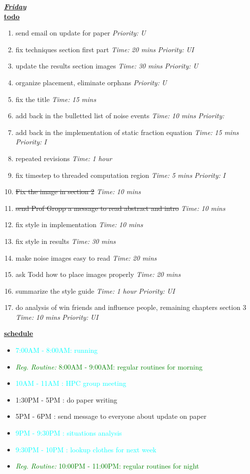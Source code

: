 \documentclass[11pt]{article}
\newcommand{\doneTask}[1]{\item \sout{#1}}
\newcommand{\timeEst}[1]{\textit{Time:} \textit{#1}}
\newcommand{\priority}[1]{\textit{Priority:} \textit{#1}}
\newcommand{\regItem}[1]{\item \textcolor{cyan}{#1}}
\newcommand{\regRoutineItem}[1]{\item \textcolor{green}{\textit{Reg. Routine:} #1}}
\begin{document}
\underline{\textbf{\textit{Friday}}}\\
\underline{\textbf{todo}}\\
\begin{enumerate}
\item send email on update for paper \priority{U}
\item fix techniques section first part \timeEst{20 mins} \priority{UI}
\item update the results section images \timeEst{30 mins} \priority{U}
\item organize placement, eliminate orphans \priority{U}
\item fix the title \timeEst{15 mins}

\item add back in the bulletted list of noise events \timeEst{10 mins} \priority{}
\item add back in the implementation of static fraction equation \timeEst{15 mins}  \priority{I}
\item repeated revisions \timeEst{1 hour}
\item fix timestep to threaded computation region \timeEst{ 5 mins  }  \priority{I}
\doneTask{ Fix the image in section 2} \timeEst{ 10 mins}
\doneTask{send Prof Gropp a message to read abstract and intro} \timeEst{10 mins}

\item fix style in implementation \timeEst{10 mins}
\item fix style in results \timeEst{30 mins}
\item make noise images easy to read \timeEst{20 mins}
\item ask Todd how to place images properly \timeEst{20 mins}

\item summarize the style guide \timeEst{1 hour} \priority{UI}
\item do analysis of win friends and influence people, remaining chapters section 3 \timeEst{10 mins}  \priority{UI}
\end{enumerate}

\underline{\textbf{schedule}}\\
\begin{itemize}
\regItem{7:00AM - 8:00AM: running}
\regRoutineItem {8:00AM - 9:00AM: regular routines for morning}
\regItem{10AM - 11AM : HPC group meeting}
\item 1:30PM - 5PM :  do paper writing
\item 5PM - 6PM : send message to everyone about update on paper
\regItem{9PM - 9:30PM :  situations analysis}
\regItem{9:30PM - 10PM :  lookup clothes for next week}
\regRoutineItem{10:00PM - 11:00PM: regular routines for night}
\end{itemize}
\end{document}

